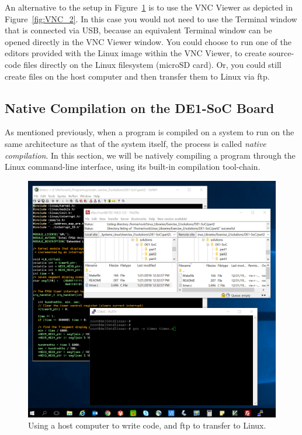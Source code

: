 \documentclass[11pt, twoside, pdftex]{article}
\begin{document}
An alternative to the setup in Figure~\ref{fig:dev_setup} is to use the VNC Viewer as
depicted in Figure~\ref{fig:VNC_2}. In this case you would not need to use the Terminal
window that is connected via USB, because an equivalent Terminal window can be opened directly
in the VNC Viewer window. You could choose to run one of the editors provided with the
Linux image within the VNC Viewer, to create source-code files directly on the Linux 
filesystem (microSD card). Or, you could still create files on the host computer and then
transfer them to Linux via ftp.

\subsection{Native Compilation on the DE1-SoC Board}
\label{sec:native_compile}

As mentioned previously, when a program is compiled on a system to run on the same architecture
as that of the system itself, the process is called {\it native compilation}. In this section,
we will be natively compiling a program through the Linux command-line interface, using its 
built-in compilation tool-chain.

\begin{figure}[H]
   \begin{center}
       \includegraphics[width=\textwidth]{figures/dev_setup_2.png}
   \end{center}
   \caption{Using a host computer to write code, and ftp to transfer to Linux.}
	\label{fig:dev_setup}
\end{figure}
\end{document}
